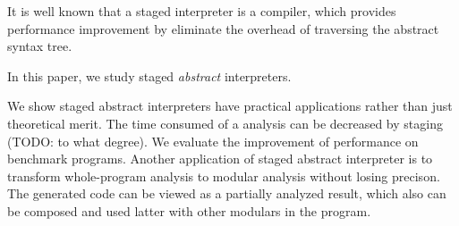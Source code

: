 It is well known that a staged interpreter is a compiler, which provides performance improvement
by eliminate the overhead of traversing the abstract syntax tree.

In this paper, we study staged \textit{abstract} interpreters.

We show staged abstract interpreters have practical applications rather than just theoretical merit.
The time consumed of a analysis can be decreased by staging (TODO: to what degree). We evaluate
the improvement of performance on benchmark programs.
Another application of staged abstract interpreter is to transform whole-program analysis
to modular analysis without losing precison. The generated code can be viewed as a 
partially analyzed result, which also can be composed and used latter with other modulars
in the program. 
